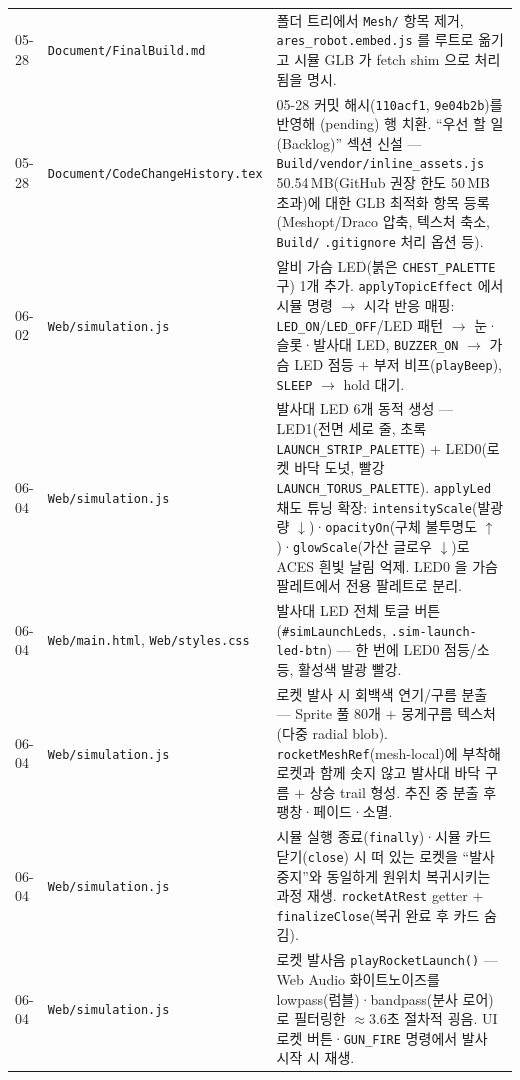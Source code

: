 \documentclass[11pt, oneside]{article}
\begin{document}
\begin{table}[h]
\begin{tabularx}{\linewidth}{@{}llX@{}}
05-28 & \texttt{Document/FinalBuild.md} & 폴더 트리에서 \texttt{Mesh/} 항목 제거, \texttt{ares\_robot.embed.js} 를 루트로 옮기고 시뮬 GLB 가 fetch shim 으로 처리됨을 명시. \\
05-28 & \texttt{Document/CodeChangeHistory.tex} & 05-28 커밋 해시(\texttt{110acf1}, \texttt{9e04b2b})를 반영해 (pending) 행 치환. ``우선 할 일 (Backlog)'' 섹션 신설 — \texttt{Build/vendor/inline\_assets.js} 50.54\,MB(GitHub 권장 한도 50\,MB 초과)에 대한 GLB 최적화 항목 등록(Meshopt/Draco 압축, 텍스처 축소, \texttt{Build/} \texttt{.gitignore} 처리 옵션 등). \\
\midrule
06-02 & \texttt{Web/simulation.js} & 알비 가슴 LED(붉은 \texttt{CHEST\_PALETTE} 구) 1개 추가. \texttt{applyTopicEffect} 에서 시뮬 명령 $\to$ 시각 반응 매핑: \texttt{LED\_ON}/\texttt{LED\_OFF}/LED 패턴 $\to$ 눈·슬롯·발사대 LED, \texttt{BUZZER\_ON} $\to$ 가슴 LED 점등 + 부저 비프(\texttt{playBeep}), \texttt{SLEEP} $\to$ hold 대기. \\
\midrule
06-04 & \texttt{Web/simulation.js} & 발사대 LED 6개 동적 생성 --- LED1\textendash 5(전면 세로 줄, 초록 \texttt{LAUNCH\_STRIP\_PALETTE}) + LED0(로켓 바닥 도넛, 빨강 \texttt{LAUNCH\_TORUS\_PALETTE}). \texttt{applyLed} 채도 튜닝 확장: \texttt{intensityScale}(발광량 $\downarrow$)·\texttt{opacityOn}(구체 불투명도 $\uparrow$)·\texttt{glowScale}(가산 글로우 $\downarrow$)로 ACES 흰빛 날림 억제. LED0 을 가슴 팔레트에서 전용 팔레트로 분리. \\
06-04 & \texttt{Web/main.html}, \texttt{Web/styles.css} & 발사대 LED 전체 토글 버튼(\texttt{\#simLaunchLeds}, \texttt{.sim-launch-led-btn}) --- 한 번에 LED0\textendash 5 점등/소등, 활성색 발광 빨강. \\
06-04 & \texttt{Web/simulation.js} & 로켓 발사 시 회백색 연기/구름 분출 --- Sprite 풀 80개 + 뭉게구름 텍스처(다중 radial blob). \texttt{rocketMeshRef}(mesh-local)에 부착해 로켓과 함께 솟지 않고 발사대 바닥 구름 + 상승 trail 형성. 추진 중 분출 후 팽창·페이드·소멸. \\
06-04 & \texttt{Web/simulation.js} & 시뮬 실행 종료(\texttt{finally})·시뮬 카드 닫기(\texttt{close}) 시 떠 있는 로켓을 ``발사 중지''와 동일하게 원위치 복귀시키는 과정 재생. \texttt{rocketAtRest} getter + \texttt{finalizeClose}(복귀 완료 후 카드 숨김). \\
06-04 & \texttt{Web/simulation.js} & 로켓 발사음 \texttt{playRocketLaunch()} --- Web Audio 화이트노이즈를 lowpass(럼블)·bandpass(분사 로어)로 필터링한 ${\approx}3.6$초 절차적 굉음. UI 로켓 버튼·\texttt{GUN\_FIRE} 명령에서 발사 시작 시 재생. \\

\end{tabularx}
\end{table}
\end{document}
